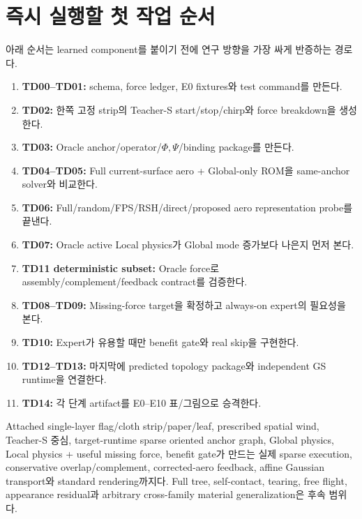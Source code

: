 \documentclass[10pt,a4paper]{article}
\begin{document}
\section{즉시 실행할 첫 작업 순서}

아래 순서는 learned component를 붙이기 전에 연구 방향을 가장 싸게 반증하는 경로다.

\begin{enumerate}
  \item \textbf{TD00--TD01:} schema, force ledger, E0 fixtures와 test command를 만든다.
  \item \textbf{TD02:} 한쪽 고정 strip의 Teacher-S start/stop/chirp와 force breakdown을 생성한다.
  \item \textbf{TD03:} Oracle anchor/operator/\(\Phi,\Psi\)/binding package를 만든다.
  \item \textbf{TD04--TD05:} Full current-surface aero + Global-only ROM을 same-anchor solver와 비교한다.
  \item \textbf{TD06:} Full/random/FPS/RSH/direct/proposed aero representation probe를 끝낸다.
  \item \textbf{TD07:} Oracle active Local physics가 Global mode 증가보다 나은지 먼저 본다.
  \item \textbf{TD11 deterministic subset:} Oracle force로 assembly/complement/feedback contract를 검증한다.
  \item \textbf{TD08--TD09:} Missing-force target을 확정하고 always-on expert의 필요성을 본다.
  \item \textbf{TD10:} Expert가 유용할 때만 benefit gate와 real skip을 구현한다.
  \item \textbf{TD12--TD13:} 마지막에 predicted topology package와 independent GS runtime을 연결한다.
  \item \textbf{TD14:} 각 단계 artifact를 E0--E10 표/그림으로 승격한다.
\end{enumerate}

\begin{tcolorbox}[colback=LightGreen,colframe=DoneGreen,title=첫 논문 최소 구현선,fonttitle=\bfseries]
Attached single-layer flag/cloth strip/paper/leaf, prescribed spatial wind, Teacher-S 중심,
target-runtime sparse oriented anchor graph, Global physics, Local physics + useful missing force,
benefit gate가 만드는 실제 sparse execution, conservative overlap/complement,
corrected-aero feedback, affine Gaussian transport와 standard rendering까지다.
Full tree, self-contact, tearing, free flight, appearance residual과 arbitrary cross-family material generalization은 후속 범위다.
\end{tcolorbox}
\end{document}
